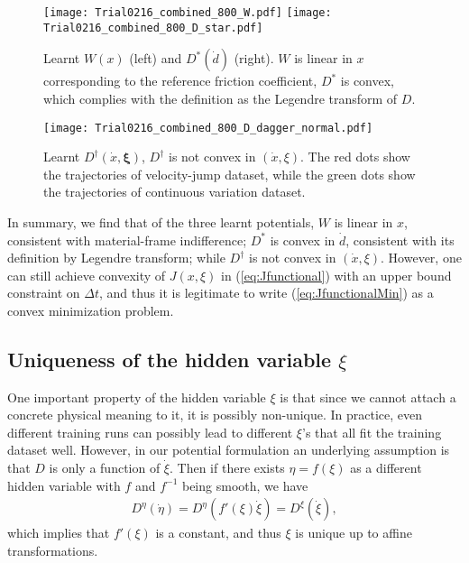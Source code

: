 \begin{figure}[htb!]
    \centering
    \texttt{[image: Trial0216\_combined\_800\_W.pdf]}
    \texttt{[image: Trial0216\_combined\_800\_D\_star.pdf]}
    \caption{Learnt $W(x)$ (left) and $D^*(\dot{d})$ (right). 
    $W$ is linear in $x$ corresponding to the reference friction coefficient, 
    $D^*$ is convex, 
    which complies with the definition as the Legendre transform of $D$.}
    \label{fig:WAndD}
\end{figure}
\begin{figure}[htb!]
    \centering
    \texttt{[image: Trial0216\_combined\_800\_D\_dagger\_normal.pdf]}
    \caption{Learnt $D^\dagger(\dot{x}, \bm{\xi})$, 
    $D^\dagger$ is not convex in $(\dot{x}, \xi)$.
    The red dots show the trajectories of velocity-jump dataset, 
    while the green dots show the trajectories of continuous variation dataset.}
    \label{fig:Ddagger}
\end{figure}

In summary, 
we find that of the three learnt potentials, 
$W$ is linear in $x$, 
consistent with material-frame indifference; 
$D^*$ is convex in $\dot{d}$, 
consistent with its definition by Legendre transform; 
while $D^\dagger$ is not convex in $(\dot{x}, \xi)$. 
However, 
one can still achieve convexity of $J(x, \xi)$ in (\ref{eq:Jfunctional}) with an upper bound constraint on $\Delta t$, 
and thus it is legitimate to write (\ref{eq:JfunctionalMin}) as a convex minimization problem. 

\subsection{Uniqueness of the hidden variable $\xi$}
One important property of the hidden variable $\xi$ is that since we cannot attach a concrete physical meaning to it, 
it is possibly non-unique. 
In practice, 
even different training runs can possibly lead to different $\xi$'s that all fit the training dataset well. 
However, 
in our potential formulation an underlying assumption is that $D$ is only a function of $\dot{\xi}$. 
Then if there exists $\eta = f(\xi)$ as a different hidden variable with $f$ and $f^{-1}$ being smooth, 
we have 
\begin{align}
    D^\eta\left(\dot{\eta}\right) = D^\eta\left(f'(\xi)\dot{\xi}\right) = D^\xi \left(\dot{\xi}\right) \label{eq:uniqueXi}, 
\end{align}
which implies that $f'(\xi)$ is a constant, 
and thus $\xi$ is unique up to affine transformations. 

